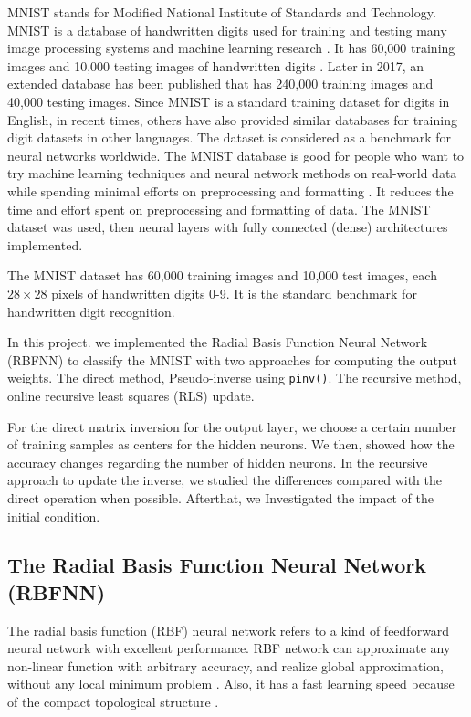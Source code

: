 \documentclass[12pt]{article}
\begin{document}
MNIST stands for Modified National Institute of Standards and Technology. MNIST is a database of handwritten digits used for training and testing many image processing systems and machine learning research \cite{lecun1998}. It has 60,000 training images and 10,000 testing images of handwritten digits \cite{lecun1998}. Later in 2017, an extended database has been published that has 240,000 training images and 40,000 testing images. Since MNIST is a standard training dataset for digits in English, in recent times, others have also provided similar databases for training digit datasets in other languages. The dataset is considered as a benchmark for neural networks worldwide. The MNIST database is good for people who want to try machine learning techniques and neural network methods on real-world data while spending minimal efforts on preprocessing and formatting \cite{lecun1998}. It reduces the time and effort spent on preprocessing and formatting of data. The MNIST dataset was used, then neural layers with fully connected (dense) architectures implemented.

The MNIST dataset has 60,000 training images and 10,000 test images, each $28 \times 28$ pixels of handwritten digits 0-9. It is the standard benchmark for handwritten digit recognition.

In this project. we implemented the Radial Basis Function Neural Network (RBFNN) to classify the MNIST with two approaches for computing the output weights. The direct method, Pseudo-inverse using \texttt{pinv()}. The recursive method, online recursive least squares (RLS) update.

For the direct matrix inversion for the output layer, we choose a certain number of training samples as centers for the hidden neurons. We then,  showed how the accuracy changes regarding the number of hidden neurons. In the recursive approach to update the inverse, we studied the differences compared with the direct operation when possible. Afterthat, we Investigated the impact of the initial condition.


	\subsection{The Radial Basis Function Neural Network (RBFNN)}
	The radial basis function (RBF) neural network refers to a kind of feedforward neural network with excellent performance. RBF network can approximate any non-linear function with arbitrary accuracy, and realize global approximation, without any local minimum problem \cite{jin2016, zhao2019}. Also, it has a fast learning speed because of the compact topological structure \cite{han2006, chen2019}.
	
\end{document}

